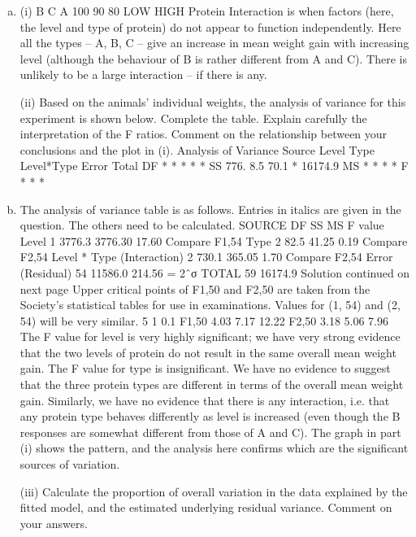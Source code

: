 \documentclass[a4paper,12pt]{article}
\begin{document}
\begin{enumerate}[(a)]
\item (i)
B
C
A
100
90
80
LOW
HIGH
Protein
Interaction is when factors (here, the level and type of protein) do not appear to function independently. Here all the types – A, B, C – give an increase in mean weight gain with increasing level (although the behaviour of B is rather different from A and C). There is unlikely to be a large interaction – if there is any.


\newpage
\begin{framed}
(ii) Based on the animals' individual weights, the analysis of variance for this
experiment is shown below. Complete the table. Explain carefully the
interpretation of the F ratios. Comment on the relationship between your
conclusions and the plot in (i).
Analysis of Variance
Source
Level
Type
Level*Type
Error
Total
DF
*
*
*
*
*
SS
776.
8.5
70.1
*
16174.9
MS
*
*
*
*
F
*
*
*


\end{framed}
\item  The analysis of variance table is as follows. Entries in italics are given in the question. The others need to be calculated.
SOURCE
DF
SS
MS
F value
Level
1
3776.3
3776.30
17.60 Compare F1,54
Type
2
82.5
41.25
0.19 Compare F2,54
Level * Type (Interaction)
2
730.1
365.05
1.70 Compare F2,54
Error (Residual)
54
11586.0
214.56
= 2ˆσ
TOTAL
59
16174.9
Solution continued on next page
Upper critical points of F1,50 and F2,50 are taken from the Society's statistical tables for use in examinations. Values for (1, 54) and (2, 54) will be very similar.
5%
1%
0.1%
F1,50
4.03
7.17
12.22
F2,50
3.18
5.06
7.96
The F value for level is very highly significant; we have very strong evidence that the two levels of protein do not result in the same overall mean weight gain.
The F value for type is insignificant. We have no evidence to suggest that the three protein types are different in terms of the overall mean weight gain.
Similarly, we have no evidence that there is any interaction, i.e. that any protein type behaves differently as level is increased (even though the B responses are somewhat different from those of A and C). The graph in part (i) shows the pattern, and the analysis here confirms which are the significant sources of variation.
\newpage
\begin{framed}

(iii)
Calculate the proportion of overall variation in the data explained by the fitted
model, and the estimated underlying residual variance. Comment on your
answers.


\end{framed}
\end{enumerate}
\end{document}
